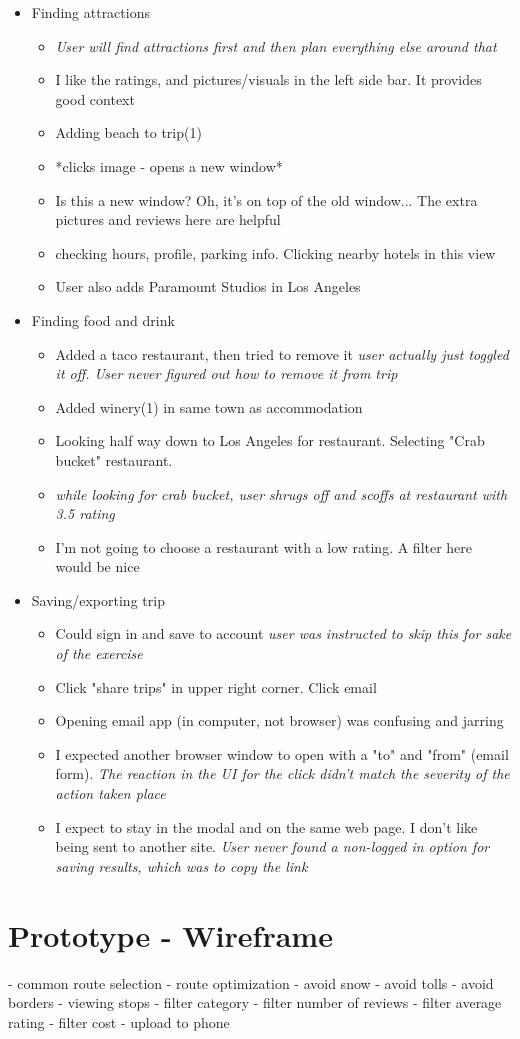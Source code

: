 \begin{itemize}
\begin{itemize}
  \end{itemize}
\item Finding attractions
  \begin{itemize}
  \item \textit{User will find attractions first and then plan everything else around that}
  \item I like the ratings, and pictures/visuals in the left side bar. It provides good context
  \item Adding beach to trip(1)
  \item *clicks image - opens a new window*
  \item Is this a new window? Oh, it's on top of the old window... The extra pictures and reviews here are helpful
  \item checking hours, profile, parking info. Clicking nearby hotels in this view
  \item User also adds Paramount Studios in Los Angeles
  \end{itemize}
\item Finding food and drink
  \begin{itemize}
  \item Added a taco restaurant, then tried to remove it \textit{user actually just toggled it off. User never figured out how to remove it from trip}
  \item Added winery(1) in same town as accommodation
  \item Looking half way down to Los Angeles for restaurant. Selecting "Crab bucket" restaurant.
  \item \textit{while looking for crab bucket, user shrugs off and scoffs at restaurant with 3.5 rating}
  \item I'm not going to choose a restaurant with a low rating. A filter here would be nice
  \end{itemize}
\item Saving/exporting trip
  \begin{itemize}
  \item Could sign in and save to account \textit{user was instructed to skip this for sake of the exercise}
  \item Click "share trips" in upper right corner. Click email
  \item Opening email app (in computer, not browser) was confusing and jarring
  \item I expected another browser window to open with a "to" and "from" (email form). \textit{The reaction in the UI for the click didn't match the severity of the action taken place}
  \item I expect to stay in the modal and on the same web page. I don't like being sent to another site. \textit{User never found a non-logged in option for saving results, which was to copy the link}
  \end{itemize}
\end{itemize}

\section{Prototype - Wireframe}

- common route selection
- route optimization
  - avoid snow
  - avoid tolls
  - avoid borders
- viewing stops
  - filter category
  - filter number of reviews
  - filter average rating
  - filter cost
- upload to phone


